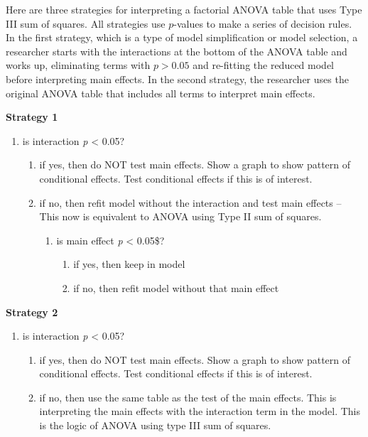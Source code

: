 \documentclass[]{book}
\providecommand{\tightlist}{%
  \setlength{\itemsep}{0pt}\setlength{\parskip}{0pt}}
\begin{document}
Here are three strategies for interpreting a factorial ANOVA table that uses Type III sum of squares. All strategies use \(p\)-values to make a series of decision rules. In the first strategy, which is a type of model simplification or model selection, a researcher starts with the interactions at the bottom of the ANOVA table and works up, eliminating terms with \(p > 0.05\) and re-fitting the reduced model before interpreting main effects. In the second strategy, the researcher uses the original ANOVA table that includes all terms to interpret main effects.

\textbf{Strategy 1}

\begin{enumerate}
\def\labelenumi{\arabic{enumi}.}
\tightlist
\item
  is interaction \emph{p} \textless{} 0.05?

  \begin{enumerate}
  \def\labelenumii{\alph{enumii}.}
  \tightlist
  \item
    if yes, then do NOT test main effects. Show a graph to show pattern of conditional effects. Test conditional effects if this is of interest.
  \item
    if no, then refit model without the interaction and test main effects -- This now is equivalent to ANOVA using Type II sum of squares.

    \begin{enumerate}
    \def\labelenumiii{\arabic{enumiii}.}
    \setcounter{enumiii}{1}
    \tightlist
    \item
      is main effect \emph{p} \textless{} 0.05\$?

      \begin{enumerate}
      \def\labelenumiv{\alph{enumiv}.}
      \tightlist
      \item
        if yes, then keep in model
      \item
        if no, then refit model without that main effect
      \end{enumerate}
    \end{enumerate}
  \end{enumerate}
\end{enumerate}

\textbf{Strategy 2}

\begin{enumerate}
\def\labelenumi{\arabic{enumi}.}
\setcounter{enumi}{1}
\tightlist
\item
  is interaction \emph{p} \textless{} 0.05?

  \begin{enumerate}
  \def\labelenumii{\alph{enumii}.}
  \tightlist
  \item
    if yes, then do NOT test main effects. Show a graph to show pattern of conditional effects. Test conditional effects if this is of interest.
  \item
    if no, then use the same table as the test of the main effects. This is interpreting the main effects with the interaction term in the model. This is the logic of ANOVA using type III sum of squares.
  \end{enumerate}
\end{enumerate}
\end{document}
